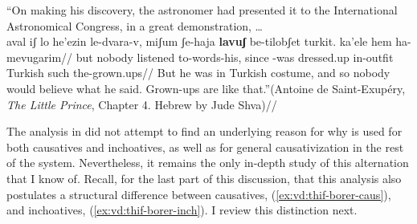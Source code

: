 	\a ``On making his discovery, the astronomer had presented it to the International Astronomical Congress, in a great demonstration, \dots\\
	\begingl
		\gla aval iʃ lo he'ezin le-dvara-v, miʃum ʃe-haja \textbf{lavuʃ} be-tilobʃet turkit. ka'ele hem ha-mevugarim//
		\glb but nobody  listened to-words-his, since -was dressed.up in-outfit Turkish such  the-grown.ups//
		\glft But he was in Turkish costume, and so nobody would believe what he said. Grown-ups are like that.''\hfill {(Antoine de Saint-Exup\'ery, \emph{The Little Prince}, Chapter 4. Hebrew by Jude Shva\footnotemark)}//
	\endgl
{}
\xe



The analysis in \cite{borer91} did not attempt to find an underlying reason for why {\thif} is used for both causatives and inchoatives, as well as for general causativization in the rest of the system. Nevertheless, it remains the only in-depth study of this alternation that I know of. Recall, for the last part of this discussion, that this analysis also postulates a structural difference between {\thif} causatives, (\ref{ex:vd:thif-borer-caus}), and inchoatives, (\ref{ex:vd:thif-borer-inch}). I review this distinction next.

